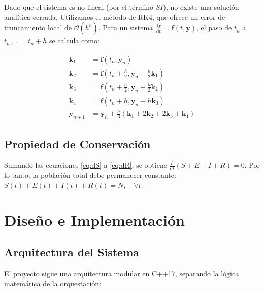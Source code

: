 \documentclass[12pt,a4paper]{article}
\theoremstyle{definition}
\newcommand{\vect}[1]{\mathbf{#1}}
\begin{document}
Dado que el sistema es no lineal (por el t\'{e}rmino $SI$), no existe una soluci\'{o}n anal\'{i}tica cerrada. Utilizamos el m\'{e}todo de RK4, que ofrece un error de truncamiento local de $\mathcal{O}(h^5)$. Para un sistema $\frac{\mathrm{d}\vect{y}}{\mathrm{d}t} = \vect{f}(t, \vect{y})$, el paso de $t_n$ a $t_{n+1} = t_n + h$ se calcula como:

\begin{align*}
\vect{k}_1 &= \vect{f}(t_n, \vect{y}_n) \\
\vect{k}_2 &= \vect{f}\left(t_n + \frac{h}{2}, \vect{y}_n + \frac{h}{2}\vect{k}_1\right) \\
\vect{k}_3 &= \vect{f}\left(t_n + \frac{h}{2}, \vect{y}_n + \frac{h}{2}\vect{k}_2\right) \\
\vect{k}_4 &= \vect{f}(t_n + h, \vect{y}_n + h\vect{k}_3) \\
\vect{y}_{n+1} &= \vect{y}_n + \frac{h}{6}(\vect{k}_1 + 2\vect{k}_2 + 2\vect{k}_3 + \vect{k}_4)
\end{align*}

\subsection{Propiedad de Conservaci\'{o}n}

Sumando las ecuaciones \ref{eq:dS} a \ref{eq:dR}, se obtiene $\frac{\mathrm{d}}{\mathrm{d}t}(S+E+I+R) = 0$. Por lo tanto, la poblaci\'{o}n total debe permanecer constante: $S(t) + E(t) + I(t) + R(t) = N, \quad \forall t$.

\section{Dise\~{n}o e Implementaci\'{o}n}\label{sec:implementacion}

\subsection{Arquitectura del Sistema}

El proyecto sigue una arquitectura modular en C++17, separando la l\'{o}gica matem\'{a}tica de la orquestaci\'{o}n:
\end{document}
